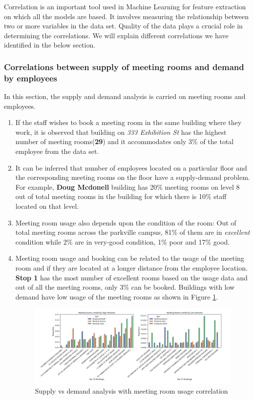 \thispagestyle{empty}
Correlation is an important tool used in Machine Learning for feature extraction on which all the models are based. It involves measuring the relationship between two or more variables in the data set. Quality of the data plays a crucial role in determining the correlations. We will explain different correlations we have identified in the below section.

\subsubsection{Correlations between supply of meeting rooms and demand by employees}
In this section, the supply and demand analysis is carried on meeting rooms and employees.
\begin{enumerate}
    \item If the staff wishes to book a meeting room in the same building where they work, it is observed that building on \textit{333 Exhibition St} has the highest number of meeting rooms(\textbf{29}) and it accommodates only 3\% of the total employee from the data set.
    \item It can be inferred that number of employees located on a particular floor and the corresponding meeting rooms on the floor have a supply-demand problem. For example, \textbf{Doug Mcdonell
} building has 20\% meeting rooms on level 8 out of total meeting rooms in the building for which there is 10\% staff located on that level.
    \item Meeting room usage also depends upon the condition of the room: Out of total meeting rooms across the parkville campus, 81\% of them are in \textit{excellent} condition while 2\% are in very-good condition, 1\% poor and 17\% good.
    \item Meeting room usage and booking can be related to the usage of the meeting room and if they are located at a longer distance from the employee location. \textbf{Stop 1} has the most number of excellent rooms based on the usage data and out of all the meeting rooms, only 3\% can be booked. Buildings with low demand have low usage of the meeting rooms as shown in Figure \ref{usagedata}.

\begin{figure}[H]
    \centering
    \includegraphics[width=1\textwidth]{resources/images/snap5.PNG}
    \caption{Supply vs demand analysis with meeting room usage correlation}
    \label{usagedata}
\end{figure}

\end{enumerate}

